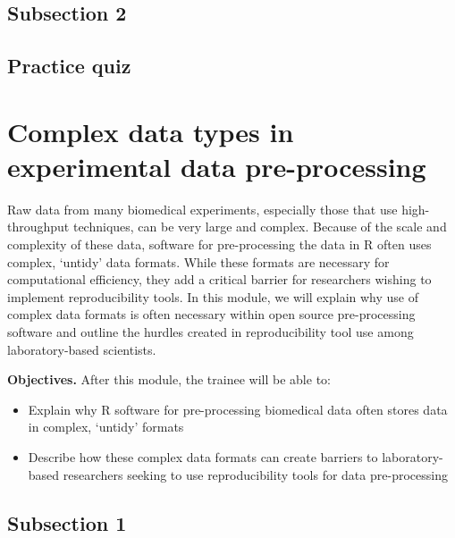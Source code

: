 \documentclass[]{tufte-book}
\providecommand{\tightlist}{%
  \setlength{\itemsep}{0pt}\setlength{\parskip}{0pt}}
\begin{document}
\hypertarget{subsection-2-4}{%
\subsection{Subsection 2}\label{subsection-2-4}}

\hypertarget{practice-quiz-2}{%
\subsection{Practice quiz}\label{practice-quiz-2}}

\hypertarget{complex-data-types-in-experimental-data-pre-processing}{%
\section{Complex data types in experimental data pre-processing}\label{complex-data-types-in-experimental-data-pre-processing}}

Raw data from many biomedical experiments, especially those that use
high-throughput techniques, can be very large and complex. Because of the scale
and complexity of these data, software for pre-processing the data in R often
uses complex, `untidy' data formats. While these formats are necessary for
computational efficiency, they add a critical barrier for researchers wishing to
implement reproducibility tools. In this module, we will explain why use of
complex data formats is often necessary within open source pre-processing
software and outline the hurdles created in reproducibility tool use among
laboratory-based scientists.

\textbf{Objectives.} After this module, the trainee will be able to:

\begin{itemize}
\tightlist
\item
  Explain why R software for pre-processing biomedical data often stores
  data in complex, `untidy' formats
\item
  Describe how these complex data formats can create barriers to
  laboratory-based researchers seeking to use reproducibility tools for
  data pre-processing
\end{itemize}

\hypertarget{subsection-1-6}{%
\subsection{Subsection 1}\label{subsection-1-6}}
\end{document}
